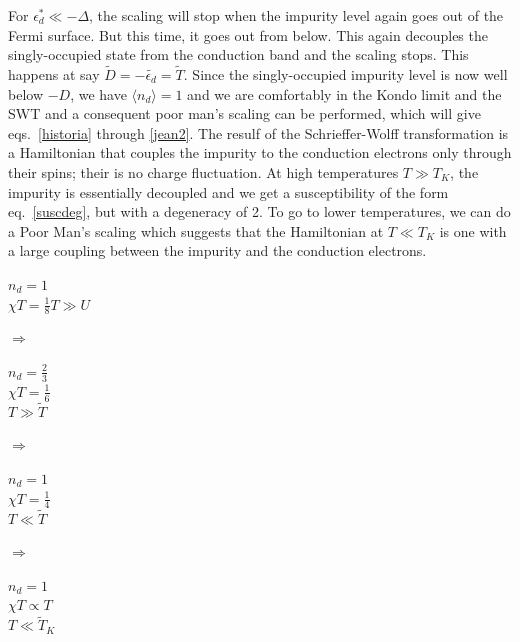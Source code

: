 \documentclass[twoside]{report}
\numberwithin{equation}{section}
\begin{document}
For \(\epsilon_d^* \ll -\Delta\), the scaling will stop when the impurity level again goes out of the Fermi surface.
But this time, it goes out from below.
This again decouples the singly-occupied state from the conduction band and the scaling stops.
This happens at say \(\widetilde D = -\widetilde {\epsilon_d} = \widetilde {T}\).
Since the singly-occupied impurity level is now well below \(-D\), we have \(\langle  n_d\rangle = 1\) and we are comfortably in the Kondo limit and the SWT and a consequent poor man's scaling can be performed, which will give eqs.~\ref{historia} through \ref{jean2}.
The resulf of the Schrieffer-Wolff transformation is a Hamiltonian that couples the impurity to the conduction electrons only through their spins; their is no charge fluctuation.
At high temperatures \(T \gg T_K\), the impurity is essentially decoupled and we get a susceptibility of the form eq.~\ref{suscdeg}, but with a degeneracy of 2.
To go to lower temperatures, we can do a Poor Man's scaling which suggests that the Hamiltonian at \(T\ll T_K\) is one with a large coupling between the impurity and the conduction electrons.
\begin{center}
\begin{minipage}{50pt}
	\(n_d = 1\)\\\(\chi T = \frac{1}{8}\)\(T\gg U\)
\end{minipage}
\hspace*{20pt}\(\Longrightarrow\)\hspace*{20pt}
\begin{minipage}{50pt}
	\(n_d = \frac{2}{3}\)\\\(\chi T = \frac{1}{6}\)\\\(T\gg \widetilde T\)
\end{minipage}
\hspace*{20pt}\(\Longrightarrow\)\hspace*{20pt}
\begin{minipage}{50pt}
	\(n_d = 1\)\\\(\chi T= \frac{1}{4}\)\\\(T\ll \widetilde T\)
\end{minipage}
\hspace*{20pt}\(\Longrightarrow\)\hspace*{20pt}
\begin{minipage}{50pt}
	\(n_d = 1\)\\\(\chi T \propto T\)\\\(T\ll \widetilde T_K\)
\end{minipage}
\end{center}
\end{document}
